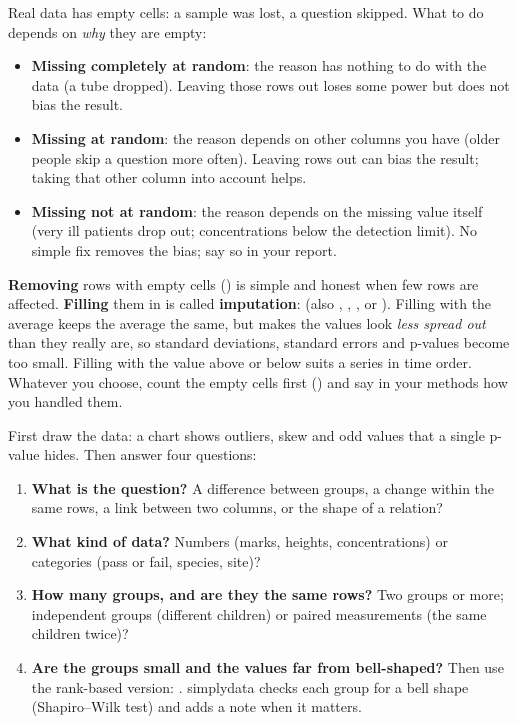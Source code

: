 
Real data has empty cells: a sample was lost, a question skipped. What to do depends on
\emph{why} they are empty:

\begin{itemize}
  \item \textbf{Missing completely at random}: the reason has nothing to do with the data (a tube
    dropped). Leaving those rows out loses some power but does not bias the result.
  \item \textbf{Missing at random}: the reason depends on other columns you have (older people skip
    a question more often). Leaving rows out can bias the result; taking that other column into
    account helps.
  \item \textbf{Missing not at random}: the reason depends on the missing value itself (very ill
    patients drop out; concentrations below the detection limit). No simple fix removes the bias;
    say so in your report.
\end{itemize}

\textbf{Removing} rows with empty cells () is
simple and honest when few rows are affected. \textbf{Filling} them in is called
\textbf{imputation}:  (also
, , , or ). Filling with
the average keeps the average the same, but makes the values look \emph{less spread out} than they
really are, so standard deviations, standard errors and p-values become too small. Filling with the
value above or below suits a series in time order. Whatever you choose, count the empty cells first
() and say in your methods how you handled them.


First draw the data: a chart shows outliers, skew and odd values that a single p-value hides. Then
answer four questions:

\begin{enumerate}
  \item \textbf{What is the question?} A difference between groups, a change within the same
    rows, a link between two columns, or the shape of a relation?
  \item \textbf{What kind of data?} Numbers (marks, heights, concentrations) or categories (pass or
    fail, species, site)?
  \item \textbf{How many groups, and are they the same rows?} Two groups or more; independent
    groups (different children) or paired measurements (the same children twice)?
  \item \textbf{Are the groups small and the values far from bell-shaped?} Then use the rank-based
    version: . simplydata checks each group for a bell shape
    (Shapiro--Wilk test) and adds a note when it matters.
\end{enumerate}

